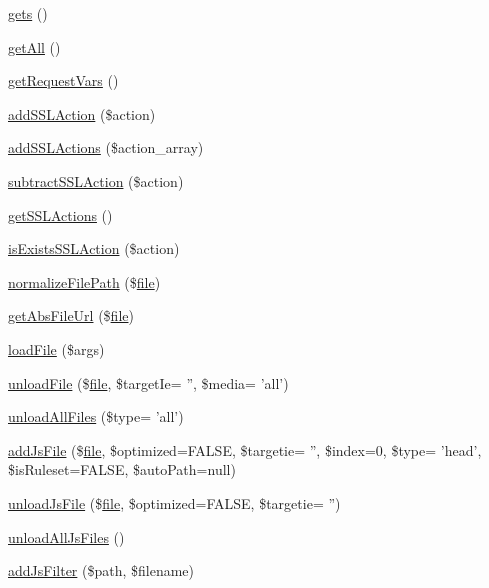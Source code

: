 \begin{DoxyCompactItemize}
\item 
\hyperlink{classContext_ae906c0b1533a8e4ce7836d3665b46288}{gets} ()
\item 
\hyperlink{classContext_a89ad6fd5c093e257e82822d16dc67ac4}{get\-All} ()
\item 
\hyperlink{classContext_a9ddbc79a7ba5892d1ea2d793f6ad52c2}{get\-Request\-Vars} ()
\item 
\hyperlink{classContext_a781f5e7a057e6f0992310318a0339ae8}{add\-S\-S\-L\-Action} (\$action)
\item 
\hyperlink{classContext_ab2acd5415515b232b7cf9f0130f4efa3}{add\-S\-S\-L\-Actions} (\$action\-\_\-array)
\item 
\hyperlink{classContext_a598cb5c571c0a1ffb15f67064e251f0d}{subtract\-S\-S\-L\-Action} (\$action)
\item 
\hyperlink{classContext_a10b68bdba6f55bc725c352aad7844dc7}{get\-S\-S\-L\-Actions} ()
\item 
\hyperlink{classContext_ada5b689e4d143f371c38091b87cfd864}{is\-Exists\-S\-S\-L\-Action} (\$action)
\item 
\hyperlink{classContext_a47a8a7878385f0d5cb7085f933157128}{normalize\-File\-Path} (\$\hyperlink{classfile}{file})
\item 
\hyperlink{classContext_a217a7ff0e32178c6a2cc761de9c88998}{get\-Abs\-File\-Url} (\$\hyperlink{classfile}{file})
\item 
\hyperlink{classContext_a01ddbd076a74f16dc46d3c7b358daea6}{load\-File} (\$args)
\item 
\hyperlink{classContext_afab39232525ca876120253feee0fe3a1}{unload\-File} (\$\hyperlink{classfile}{file}, \$target\-Ie= '', \$media= 'all')
\item 
\hyperlink{classContext_a9125192700ddd7a2234f34a192165902}{unload\-All\-Files} (\$type= 'all')
\item 
\hyperlink{classContext_a69807c3ced3f97920b233a3fce3bb492}{add\-Js\-File} (\$\hyperlink{classfile}{file}, \$optimized=F\-A\-L\-S\-E, \$targetie= '', \$index=0, \$type= 'head', \$is\-Ruleset=F\-A\-L\-S\-E, \$auto\-Path=null)
\item 
\hyperlink{classContext_ac5016f24f0bd279096d3f0cd0c0df5a9}{unload\-Js\-File} (\$\hyperlink{classfile}{file}, \$optimized=F\-A\-L\-S\-E, \$targetie= '')
\item 
\hyperlink{classContext_ac8ac4c21583b50815eb01d9cc4f6405f}{unload\-All\-Js\-Files} ()
\item 
\hyperlink{classContext_ae93f59a2ffac5a3074acd304d10ad7b3}{add\-Js\-Filter} (\$path, \$filename)
\item 

\end{DoxyCompactItemize}

